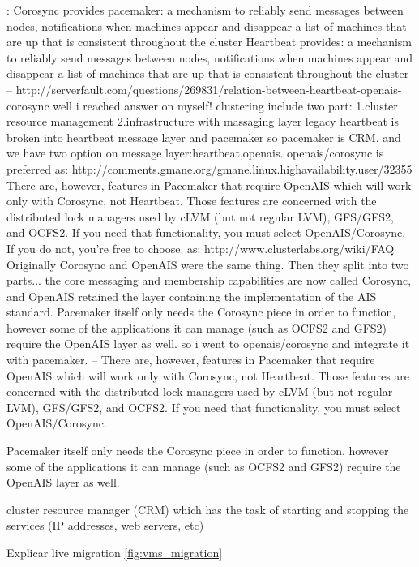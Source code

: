 \cite{clusterlabs}:
Corosync provides pacemaker:
a mechanism to reliably send messages between nodes,
notifications when machines appear and disappear
a list of machines that are up that is consistent throughout the cluster 
Heartbeat provides:
a mechanism to reliably send messages between nodes,
notifications when machines appear and disappear
a list of machines that are up that is consistent throughout the cluster 
--
http://serverfault.com/questions/269831/relation-between-heartbeat-openais-corosync
well i reached answer on myself! clustering include two part:
1.cluster resource management
2.infrastructure with massaging layer
legacy heartbeat is broken into heartbeat message layer and pacemaker so pacemaker is CRM.
and we have two option on message layer:heartbeat,openais. openais/corosync is preferred as: http://comments.gmane.org/gmane.linux.highavailability.user/32355
There are, however, features in Pacemaker that require OpenAIS which will work only with Corosync, not Heartbeat. Those features are concerned 
with the distributed lock managers used by cLVM (but not regular LVM), GFS/GFS2, and OCFS2. If you need that functionality, you must select 
OpenAIS/Corosync. If you do not, you're free to choose.
as: http://www.clusterlabs.org/wiki/FAQ
Originally Corosync and OpenAIS were the same thing. Then they split into two parts... the core messaging and membership capabilities are now 
called Corosync, and OpenAIS retained the layer containing the implementation of the AIS standard.
Pacemaker itself only needs the Corosync piece in order to function, however some of the applications it can manage (such as OCFS2 and GFS2) 
require the OpenAIS layer as well.
so i went to openais/corosync and integrate it with pacemaker.
--
There are, however, features in Pacemaker that require OpenAIS which
will work only with Corosync, not Heartbeat. Those features are
concerned with the distributed lock managers used by cLVM (but not
regular LVM), GFS/GFS2, and OCFS2. If you need that functionality, you
must select OpenAIS/Corosync.

Pacemaker itself only needs the Corosync piece in order to function, however some of the applications it can manage 
(such as OCFS2 and GFS2) require the OpenAIS layer as well. 

cluster resource manager (CRM) which has the task of starting and stopping the services (IP addresses, web servers, etc)


Explicar live migration \ref{fig:vms_migration}


